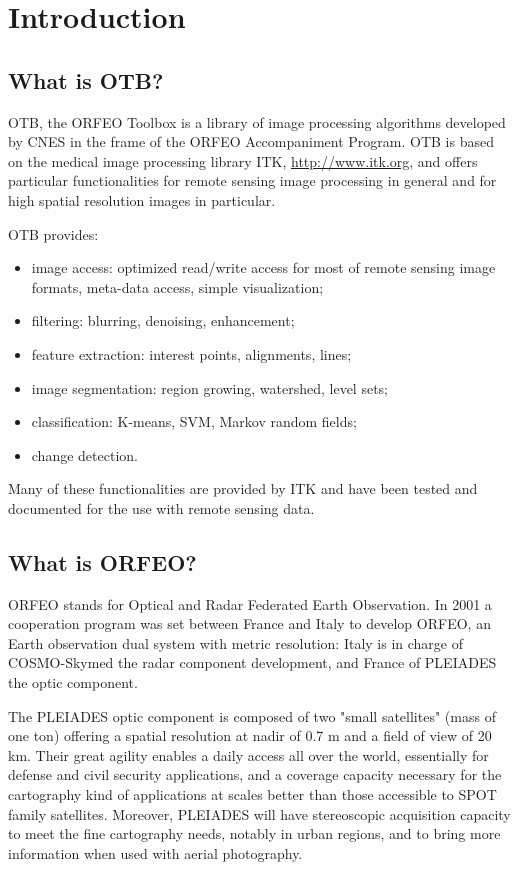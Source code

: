 \section{Introduction}
\subsection{What is OTB?}
OTB, the ORFEO Toolbox is a library of image processing algorithms developed by CNES in the
frame of the ORFEO Accompaniment Program. 
OTB is based on the medical image processing library ITK, \url{http://www.itk.org}, and offers
particular functionalities for remote sensing image processing in
general and for high spatial resolution images in particular.

OTB provides:
\begin{itemize}
\item image access: optimized read/write access for most of remote sensing
image formats, meta-data access, simple visualization;
\item filtering: blurring, denoising, enhancement;
\item feature extraction: interest points, alignments, lines;
\item image segmentation: region growing, watershed, level sets;
\item classification: K-means, SVM, Markov random fields; 
\item change detection.  
\end{itemize}


Many of these functionalities are provided by ITK and have been tested
and documented for the use with remote sensing data.

\subsection{What is ORFEO?}
ORFEO stands for Optical and Radar Federated Earth Observation.  In
2001 a cooperation program was set between France and Italy to develop
ORFEO, an Earth observation dual system with metric resolution: Italy
is in charge of COSMO-Skymed the radar component development, and
France of PLEIADES the optic component.

The PLEIADES optic component is composed of two "small satellites"
(mass of one ton) offering a spatial resolution at nadir of 0.7 m and
a field of view of 20 km. Their great agility enables a daily access
all over the world, essentially for defense and civil security
applications, and a coverage capacity necessary for the cartography
kind of applications at scales better than those accessible to SPOT
family satellites. Moreover, PLEIADES will have stereoscopic
acquisition capacity to meet the fine cartography needs, notably in
urban regions, and to bring more information when used with aerial
photography.

